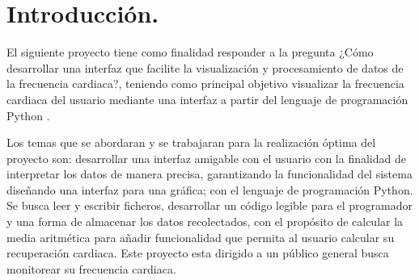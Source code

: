 \documentclass[16pt]{article}
\begin{document}
\begin{abstract}
	The precise monitoring of heart-rate is essential to asses the cardiovascular health status of patients, particularly in a clinical or preventive context. This project develops an advanced graphical interface for the visualization and data processing of a heart beat signal, designed through object-oriented programming powered by Python. With the MAX-30100 optical sensor and an Raspberry pi pico plate, signals are captured after being processed through specific filters developed by specialists in the area of electronic instrumentation, plotted and analyzed. The system employs libraries such as Tkinter and Custom Tkinter for the creation of an interactive interface, and Matplotlib to visualize real time data.
	
	The modular design of the software optimices the reusability and scalability of the script, whilst the management of Git and GitHub versions guarantees traceability and effective collaboration. This type of development not only ensures biomedical signals analysis, but includes features to calculate the recovery heart rate, and the management of historical records in .CSV format. Furthermore, this project stablishes a technical foundation for future applications in Telemedicine, by merging biomedical engineering principles and low-cost technologies. Our work responds the growing demand of non-invasive and reliable tools for physiological parameters monitoring.
	
	\paragraph{Keywords:}
	Heart rate , Interface, Heart rate Filter, Interface for a Filter, SPython, Medical Interface, Biomedical Engineering, Raspberry pi pico.
\end{abstract}

\section{Introducción.}
El siguiente proyecto tiene como finalidad responder a la pregunta ¿Cómo desarrollar una interfaz que facilite la visualización y procesamiento de datos de la frecuencia cardiaca?, teniendo como principal objetivo visualizar la frecuencia cardiaca del usuario mediante una interfaz a partir del lenguaje de programación Python \cite{python}. 

Los temas que se abordaran y se trabajaran para la realización óptima del proyecto son: desarrollar una interfaz amigable con el usuario con la finalidad de interpretar los datos de manera precisa, garantizando la funcionalidad del sistema diseñando una interfaz para una gráfica; con el lenguaje de programación Python. Se busca leer y escribir ficheros, desarrollar un código legible para el programador y una forma de almacenar los datos recolectados, con el propósito de calcular la media aritmética para añadir funcionalidad que permita al usuario calcular su recuperación cardiaca. Este proyecto esta dirigido a un público general busca monitorear su frecuencia cardiaca.  
\end{document}
